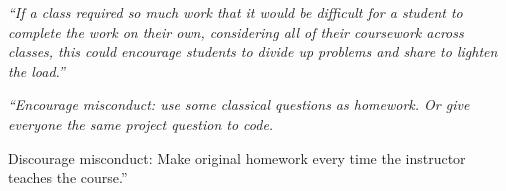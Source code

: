 \documentclass[12pt]{beamer}
\newcommand\ans[1]{{\it ``#1''}}
\newcommand\gap{\vspace{5mm}}
\begin{document}
\begin{frame}

  \ans{If a class required so much work that it would be difficult for a student to complete the  work  on  their  own,  considering  all  of  their  coursework  across  classes,  this  could encourage students to divide up problems and share to lighten the load.}

  \gap

  \ans{Encourage misconduct:  use some classical questions as homework.  Or give everyone the same project question to code.

    Discourage misconduct:  Make original homework every time the instructor teaches the course.}

  


\end{frame}
\end{document}
